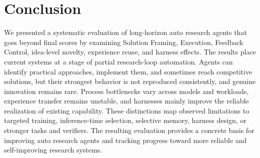 \section{Conclusion}

We presented a systematic evaluation of long-horizon auto research agents that goes beyond final scores by examining Solution Framing, Execution, Feedback Control, idea-level novelty, experience reuse, and harness effects.
The results place current systems at a stage of partial research-loop automation.
Agents can identify practical approaches, implement them, and sometimes reach competitive solutions, but their strongest behavior is not reproduced consistently, and genuine innovation remains rare.
Process bottlenecks vary across models and workloads, experience transfer remains unstable, and harnesses mainly improve the reliable realization of existing capability.
These distinctions map observed limitations to targeted training, inference-time selection, selective memory, harness design, or stronger tasks and verifiers.
The resulting evaluation provides a concrete basis for improving auto research agents and tracking progress toward more reliable and self-improving research systems.
